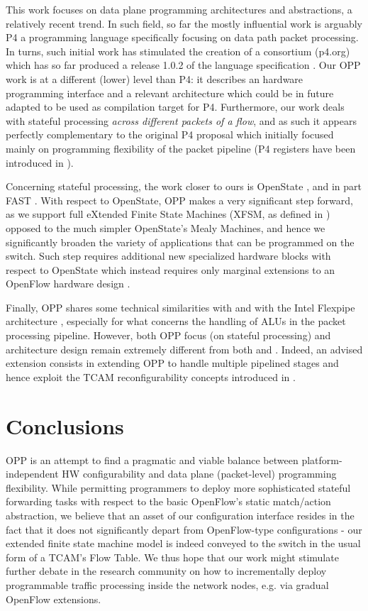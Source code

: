 \documentclass{sig-alternate}
\begin{document}
This work focuses on data plane programming architectures and abstractions, a relatively recent trend. In such field, so far the mostly influential work is arguably P4 \cite{Bos14} a programming language specifically focusing on data path packet processing. In turns, such initial work has stimulated the creation of a consortium (p4.org) which has so far produced a release 1.0.2 of the language specification \cite{P4spec}. Our OPP work is at a different (lower) level than P4: it describes an hardware programming interface and a relevant architecture which could be in future adapted to be used as compilation target \cite{Jos15} for P4. Furthermore, our work deals with stateful processing {\em across different packets of a flow}, and as such it appears perfectly complementary to the original P4 proposal \cite{Bos14} which initially focused mainly on programming flexibility of the packet pipeline (P4 registers have been introduced in \cite{P4spec}). 

Concerning stateful processing, the work closer to ours is OpenState \cite{ccr14}, and in part FAST \cite{Mos14}. With respect to OpenState, OPP makes a very significant step forward, as we support full eXtended Finite State Machines (XFSM, as defined in \cite{Che93}) opposed to the much simpler OpenState's Mealy Machines, and hence we significantly broaden the variety of applications that can be programmed on the switch. Such step requires additional new specialized hardware blocks with respect to OpenState which instead requires only marginal extensions to an OpenFlow hardware design \cite{Pon15}. 

Finally, OPP shares some technical similarities with \cite{Bos13} and with the Intel Flexpipe architecture \cite{flexpipe}, especially for what concerns the handling of ALUs in the packet processing pipeline. However, both OPP focus (on stateful processing) and architecture design remain extremely different from both \cite{Bos13} and \cite{flexpipe}. Indeed, an advised extension consists in extending OPP to handle multiple pipelined stages and hence exploit the TCAM reconfigurability concepts introduced in \cite{Bos13}. 



\section{Conclusions}
\label{s:conclusions}
OPP is an attempt to find a pragmatic and viable balance between platform-independent HW configurability and data plane (packet-level) programming flexibility. While permitting programmers to deploy more sophisticated stateful forwarding tasks with respect to the basic OpenFlow's static match/action abstraction, we believe that an asset of our configuration interface resides in the fact that it does not significantly depart from OpenFlow-type configurations - our extended finite state machine model is indeed  conveyed to the switch in the usual form of a TCAM's Flow Table. We thus hope that our work might stimulate further debate in the research community on how to incrementally deploy programmable traffic processing inside the network nodes, e.g. via gradual OpenFlow extensions. 

\newpage



\end{document}
